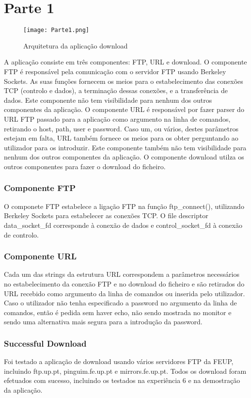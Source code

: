 \documentclass[a4paper]{article}
\begin{document}
\section{Parte 1}

\begin{figure}[h]
    \centering
    \texttt{[image: Parte1.png]}
    \caption{Arquitetura da aplicação download}
\end{figure}


A aplicação consiste em três componentes: FTP, URL e download.
O componente FTP é responsável pela comunicação com o servidor FTP usando Berkeley Sockets. As suas funções fornecem os meios para o estabelecimento das conexões TCP (controlo e dados), a terminação dessas conexões, e a transferência de dados. Este componente não tem visibilidade para nenhum dos outros componentes da aplicação.
O componente URL é responsável por fazer parser do URL FTP passado para a aplicação como argumento na linha de comandos, retirando o host, path, user e password. Caso um, ou vários, destes parâmetros estejam em falta, URL também fornece os meios para os obter perguntando ao utilizador para os introduzir. Este componente também não tem visibilidade para nenhum dos outros componentes da aplicação.
O componente download utilza os outros componentes para fazer o download do ficheiro.

\subsubsection{Componente FTP}
O componete FTP estabelece a ligação FTP na função ftp\_connect(), utilizando Berkeley Sockets para estabelecer as conexões TCP. O file descriptor data\_socket\_fd corresponde à conexão de dados e control\_socket\_fd à conexão de controlo.

\subsubsection{Componente URL}
Cada um das strings da estrutura URL correspondem a parâmetros necessários no estabelecimento da conexão FTP e no download do ficheiro e são retirados do URL recebido como argumento da linha de comandos ou inserida pelo utilizador. Caso o utilizador não tenha especificado a password no argumento da linha de comandos, então é pedida sem haver echo, não sendo mostrada no monitor e sendo uma alternativa mais segura para a introdução da password.

\subsubsection{Successful Download}
Foi testado a aplicação de download usando vários servidores FTP da FEUP, incluindo ftp.up.pt, pinguim.fe.up.pt e mirrors.fe.up.pt. Todos os download foram efetuados com sucesso, incluindo os testados na experiência 6 e na demostração da aplicação.
\end{document}
